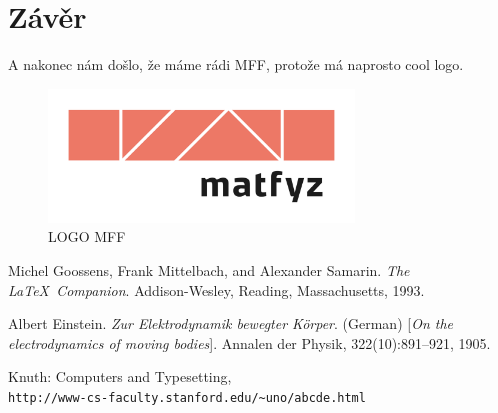 \documentclass{article}
\begin{document}
\section*{Závěr}
\par A nakonec nám došlo, že máme rádi MFF, protože má naprosto cool logo.
\begin{figure}[!ht]
\centering
\caption{LOGO MFF}
\includegraphics[width=230pt]{matfyz_barevne.png}
\end{figure}

\renewcommand\refname{Použitá literatura}
\begin{thebibliography}{}
Michel Goossens, Frank Mittelbach, and Alexander Samarin. 
\textit{The \LaTeX\ Companion}. 
Addison-Wesley, Reading, Massachusetts, 1993.
 
Albert Einstein. 
\textit{Zur Elektrodynamik bewegter K{\"o}rper}. (German) 
[\textit{On the electrodynamics of moving bodies}]. 
Annalen der Physik, 322(10):891–921, 1905.
 
Knuth: Computers and Typesetting,
\\\texttt{http://www-cs-faculty.stanford.edu/\~{}uno/abcde.html}
\end{thebibliography}
\end{document}
